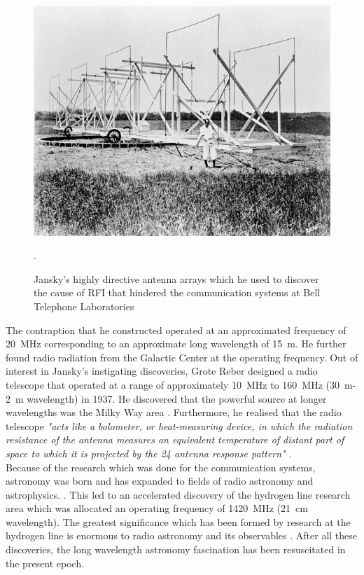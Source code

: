 \documentclass[12pt,a4paper]{report}
\begin{document}
	\begin{figure}[htb]
		\begin{center}
			\includegraphics[width=0.7\linewidth]{Figures/jansky1.jpg}
			\caption{Jansky's highly directive antenna arrays which he used to discover the cause of RFI that hindered the communication systems at Bell Telephone Laboratories  \cite{book:BasicsofRA}}.
			\label{Fig:Jansky}
		\end{center}
	\end{figure}
	The contraption that he constructed operated at an approximated frequency of \SI{20}{MHz} corresponding to an approximate long wavelength of \SI{15}{m}. He further found radio radiation from the Galactic Center at the operating frequency. Out of interest in Jansky's instigating discoveries, Grote Reber designed a radio telescope that operated at a range of approximately \SI{10}{MHz} to \SI{160}{MHz} (\SI{30}{m}-\SI{2}{m} wavelength) in 1937. He discovered that the powerful source at longer wavelengths was the Milky Way area . Furthermore, he realised that the radio telescope \textit{"acts like a bolometer, or heat-measuring device, in which the radiation resistance of the antenna measures an equivalent temperature of distant part of space to which it is projected by the 24 antenna response pattern"} \cite{1988JRASC..82...93R,CosmicStatic,2012PASP..124.1090H}.\\[0.1cm]
	
	Because of the research which was done for the communication systems, astronomy was born and has expanded to fields of radio astronomy and astrophysics. \cite{2012PASP..124.1090H}. This led to an accelerated discovery of the hydrogen line research area which was allocated an operating frequency of \SI{1420}{MHz} (\SI{21}{cm} wavelength). The greatest significance which has been formed by research at the hydrogen line is enormous to radio astronomy and its observables \cite{10.2307/530765}. After all these discoveries, the long wavelength astronomy fascination has been resuscitated in the present epoch.
\end{document}
